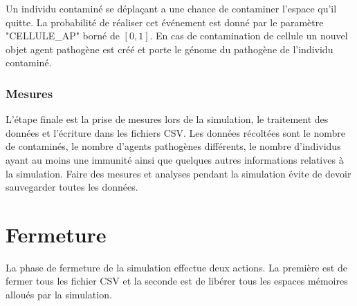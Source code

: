 Un individu contaminé se déplaçant a une chance de contaminer l'espace qu'il quitte. La probabilité de réaliser cet événement est donné par le paramètre {\small "CELLULE\_AP"} borné de $[0,1]$. En cas de contamination de cellule un nouvel objet agent pathogène est créé et porte le génome du pathogène de l'individu contaminé. 

\subsubsection{Mesures}

L'étape finale est la prise de mesures lors de la simulation, le traitement des données et l'écriture dans les fichiers CSV. Les données récoltées sont le nombre de contaminés, le nombre d'agents pathogènes différents, le nombre d'individus ayant au moins une immunité ainsi que quelques autres informations relatives à la simulation. Faire des mesures et analyses pendant la simulation évite de devoir sauvegarder toutes les données.\\

\section{Fermeture}

La phase de fermeture de la simulation effectue deux actions. La première est de fermer tous les fichier CSV et la seconde est de libérer tous les espaces mémoires alloués par la simulation.